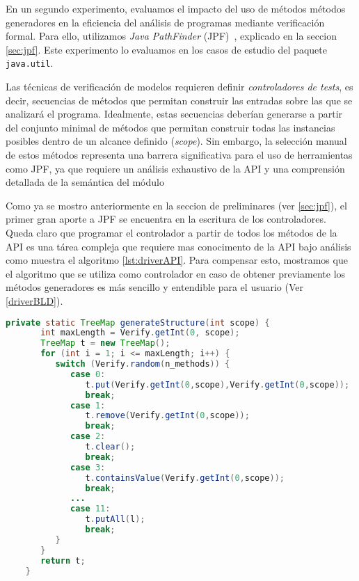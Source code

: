En un segundo experimento, evaluamos el impacto del uso de métodos métodos generadores en la eficiencia 
del análisis de programas mediante verificación formal. Para ello, utilizamos \emph{Java PathFinder} 
(JPF)~\cite{Visser:2005}, explicado en la seccion \ref{sec:jpf}.
Este experimento lo evaluamos en los casos de estudio del paquete \texttt{java.util}.

Las técnicas de verificación de modelos requieren definir \emph{controladores de tests}, es decir, 
secuencias de métodos que permitan construir las entradas sobre las que se analizará el programa. 
Idealmente, estas secuencias deberían generarse a partir del conjunto minimal de métodos que permitan 
construir todas las instancias posibles dentro de un alcance definido (\emph{scope}). Sin embargo, 
la selección manual de estos métodos representa una barrera significativa para el uso de herramientas 
como JPF, ya que requiere un análisis exhaustivo de la API y una comprensión detallada de la 
semántica del módulo

Como ya se mostro anteriormente en la seccion de preliminares (ver \ref{sec:jpf}), el primer gran aporte a JPF se
encuentra en la escritura de los controladores. Queda claro que programar el controlador
a partir de todos los métodos de la API es una tárea compleja que requiere
mas conocimento de la API bajo análisis como muestra el algoritmo \ref{lst:driverAPI}. Para
compensar esto, mostramos que el algoritmo que se utiliza como controlador en caso
de obtener previamente los métodos generadores es más sencillo y entendible para el usuario (Ver \ref{driverBLD}).

\begin{lstlisting}[language=Java,caption={Controlador con todos los métodos},label={lst:driverAPI},captionpos=b]
    private static TreeMap generateStructure(int scope) {
       int maxLength = Verify.getInt(0, scope);
       TreeMap t = new TreeMap();
       for (int i = 1; i <= maxLength; i++) {
          switch (Verify.random(n_methods)) {
             case 0:
                t.put(Verify.getInt(0,scope),Verify.getInt(0,scope));
                break;
             case 1:
                t.remove(Verify.getInt(0,scope));
                break;						
             case 2:
                t.clear();
                break;
             case 3:
                t.containsValue(Verify.getInt(0,scope));
                break;
             ...
             case 11: 
                t.putAll(l);
                break;
          }
       }
       return t;
    }
\end{lstlisting}

